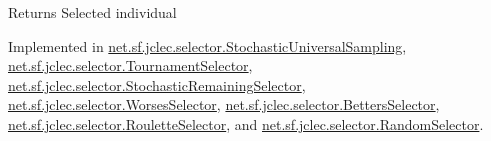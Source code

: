 \begin{DoxyReturn}{Returns}
Selected individual 
\end{DoxyReturn}


Implemented in \hyperlink{classnet_1_1sf_1_1jclec_1_1selector_1_1_stochastic_universal_sampling_a98f656114c234fdc5ddcf8e532bebe22}{net.\-sf.\-jclec.\-selector.\-Stochastic\-Universal\-Sampling}, \hyperlink{classnet_1_1sf_1_1jclec_1_1selector_1_1_tournament_selector_af2743032d654d6bac87391ddfab4cd1a}{net.\-sf.\-jclec.\-selector.\-Tournament\-Selector}, \hyperlink{classnet_1_1sf_1_1jclec_1_1selector_1_1_stochastic_remaining_selector_aa334f3ed9889328cc51632ccf178123b}{net.\-sf.\-jclec.\-selector.\-Stochastic\-Remaining\-Selector}, \hyperlink{classnet_1_1sf_1_1jclec_1_1selector_1_1_worses_selector_a11a1329db7f422cc0a3e3292a6ed46a1}{net.\-sf.\-jclec.\-selector.\-Worses\-Selector}, \hyperlink{classnet_1_1sf_1_1jclec_1_1selector_1_1_betters_selector_aafc05c782c8e38e6c39130fc3c1fa1a3}{net.\-sf.\-jclec.\-selector.\-Betters\-Selector}, \hyperlink{classnet_1_1sf_1_1jclec_1_1selector_1_1_roulette_selector_a4403c44d775ee37fd7c8d69662106499}{net.\-sf.\-jclec.\-selector.\-Roulette\-Selector}, and \hyperlink{classnet_1_1sf_1_1jclec_1_1selector_1_1_random_selector_a0771964cb15ffb2de63ec98292bddcdd}{net.\-sf.\-jclec.\-selector.\-Random\-Selector}.



